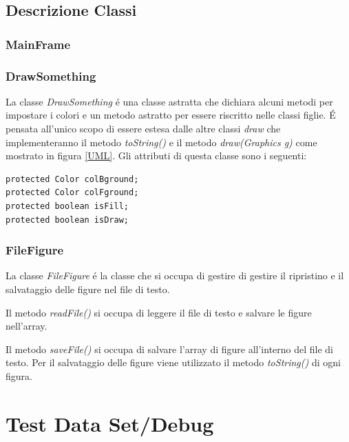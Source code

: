 \documentclass[a4paper,12pt,times,numbered,print,index]{article}
\begin{document}
\subsection{Descrizione Classi}
\subsubsection{MainFrame} %
\subsubsection{DrawSomething} %
La classe \textit{DrawSomething} é una classe astratta che dichiara alcuni metodi per impostare i colori e un metodo astratto per essere riscritto nelle classi figlie.
É pensata all'unico scopo di essere estesa dalle altre classi \textit{draw} che implementeranno il metodo \textit{toString()} e il metodo \textit{draw(Graphics g)} come mostrato in figura \ref{UML}.
Gli attributi di questa classe sono i seguenti:
\begin{lstlisting}
protected Color colBground;
protected Color colFground;
protected boolean isFill;
protected boolean isDraw;
\end{lstlisting}
\subsubsection{FileFigure}
La classe \textit{FileFigure} é la classe che si occupa di gestire di gestire il ripristino e il salvataggio delle figure nel file di testo.

Il metodo \textit{readFile()} si occupa di leggere il file di testo e salvare le figure nell'array.

Il metodo \textit{saveFile()} si occupa di salvare l'array di figure all'interno del file di testo. Per il salvataggio delle figure viene utilizzato il metodo \textit{toString()} di ogni figura.


\section{Test Data Set/Debug}

\printbibliography
\end{document}
